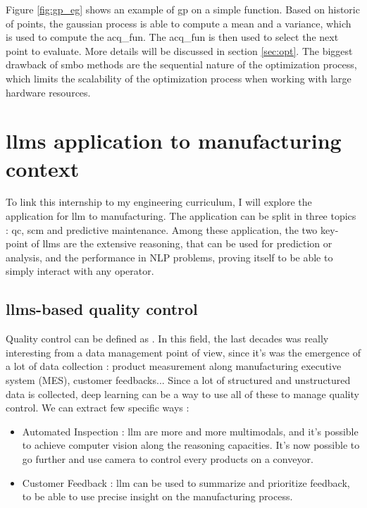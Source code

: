 Figure \ref{fig:gp_eg} shows an example of \acrfull{gp} on a simple function. Based on historic of points, the gaussian process is able to compute a mean and a variance, which is used to compute the \gls{acq_fun}. The \gls{acq_fun} is then used to select the next point to evaluate. More details will be discussed in section \ref{sec:opt}. The biggest drawback of \acrshort{smbo} methods are the sequential nature of the optimization process, which limits the scalability of the optimization process when working with large hardware resources.



\section{\glspl{llm} application to manufacturing context}
\label{sec:llm_manufacturing}
To link this internship to my engineering curriculum, I will explore the application for \acrshort{llm} to manufacturing. The application can be split in three topics : \acrfull{qc}, \acrfull{scm} and predictive maintenance. Among these application, the two key-point of \glspl{llm} are the extensive reasoning, that can be used for prediction or analysis, and the performance in NLP problems, proving itself to be able to simply interact with any operator.

\subsection{\glspl{llm}-based quality control}
\label{sec:llm_quality}
Quality control can be defined as  \cite{noauthor_what_nodate}. In this field, the last decades was really interesting from a data management point of view, since it's was the emergence of a lot of data collection : product measurement along manufacturing executive system (MES), customer feedbacks... Since a lot of structured and unstructured data is collected, deep learning can be a way to use all of these to manage quality control. We can extract few specific ways : 

\begin{itemize}
    \item Automated Inspection : \acrshort{llm} are more and more multimodals, and it's possible to achieve computer vision along the reasoning capacities. It's now possible to go further and use camera to control every products on a conveyor. 
    \item Customer Feedback : \acrshort{llm} can be used to summarize and prioritize feedback, to be able to use precise insight on the manufacturing process.
\end{itemize}

